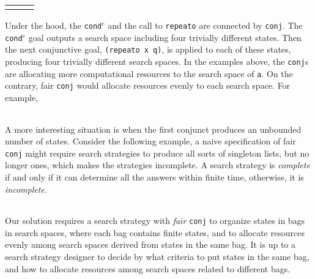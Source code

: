 \documentclass[format=acmlarge, review=true, authordraft=true]{acmart}
\newcommand{\conde}{\texttt{cond$^e$}}
\newcommand{\conj}{\texttt{conj}}
\begin{document}
\begin{center}
\begin{tabular}{l|c|r}
     &
     &
     \\
\end{tabular}
\end{center}

Under the hood, the \conde{} and the call to \texttt{repeato} are connected by 
\conj{}. The \conde{} goal outputs a search space including four trivially 
different states. Then the next conjunctive goal, \texttt{(repeato x q)}, is 
applied to each of these states, producing four trivially different search 
spaces. In the examples above, the \conj{}s are allocating more computational 
resources to the search space of \texttt{a}. On the contrary, fair \conj{} 
would allocate resources evenly to each search space. For example,

\begin{center}
	\begin{tabular}{c}
		
	\end{tabular}
\end{center}

A more interesting situation is when the first conjunct produces an unbounded
number of states. Consider the following example, a naive specification of fair \conj{} 
might require search strategies to produce all sorts of singleton lists, but no 
longer ones, which makes the strategies incomplete. A search strategy is 
\emph{complete} if and only if it can determine all the answers within finite 
time, otherwise, it is \emph{incomplete}.

\begin{center}
	\begin{tabular}{c}
		
	\end{tabular}
\end{center}

Our solution requires a search strategy with \emph{fair} \conj{} to organize
states in bags in search spaces, where each bag contains finite states, and 
to allocate resources evenly among search spaces derived from states in the 
same bag. It is up to a search strategy designer to decide by what criteria to 
put states in the same bag, and how to allocate resources among search spaces 
related to different bags.
\end{document}
